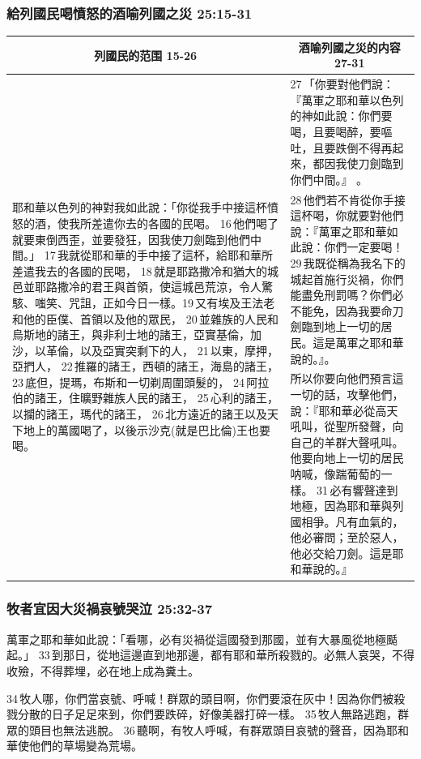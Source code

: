 \subsubsection{給列國民喝憤怒的酒喻列國之災 25:15-31}
\begin{table}[H]
\centering
\begin{tabular}{p{9.25cm}|p{}}\hline\hline
\multicolumn{1}{c|}{列國民的范围 15-26}&\multicolumn{1}{c}{酒喻列國之災的内容 27-31}\\\hline
\multirow{3}{9.35cm}{耶和華以色列的神對我如此說：「你從我手中接這杯憤怒的酒，使我所差遣你去的各國的民喝。 16 他們喝了就要東倒西歪，並要發狂，因我使刀劍臨到他們中間。」 17 我就從耶和華的手中接了這杯，給耶和華所差遣我去的各國的民喝， 18 就是耶路撒冷和猶大的城邑並耶路撒冷的君王與首領，使這城邑荒涼，令人驚駭、嗤笑、咒詛，正如今日一樣。19 又有埃及王法老和他的臣僕、首領以及他的眾民， 20 並雜族的人民和烏斯地的諸王，與非利士地的諸王，亞實基倫，加沙，以革倫，以及亞實突剩下的人， 21 以東，摩押，亞捫人， 22 推羅的諸王，西頓的諸王，海島的諸王， 23 底但，提瑪，布斯和一切剃周圍頭髮的， 24 阿拉伯的諸王，住曠野雜族人民的諸王， 25 心利的諸王，以攔的諸王，瑪代的諸王， 26 北方遠近的諸王以及天下地上的萬國喝了，以後示沙克(就是巴比倫)王也要喝。}
&27 「你要對他們說：『萬軍之耶和華以色列的神如此說：你們要喝，且要喝醉，要嘔吐，且要跌倒不得再起來，都因我使刀劍臨到你們中間。』 。\\\cline{2-2}
&28 他們若不肯從你手接這杯喝，你就要對他們說：『萬軍之耶和華如此說：你們一定要喝！ 29 我既從稱為我名下的城起首施行災禍，你們能盡免刑罰嗎？你們必不能免，因為我要命刀劍臨到地上一切的居民。這是萬軍之耶和華說的。』。\\\cline{2-2}
&所以你要向他們預言這一切的話，攻擊他們，說：『耶和華必從高天吼叫，從聖所發聲，向自己的羊群大聲吼叫。他要向地上一切的居民呐喊，像踹葡萄的一樣。 31 必有響聲達到地極，因為耶和華與列國相爭。凡有血氣的，他必審問；至於惡人，他必交給刀劍。這是耶和華說的。』\\\hline
\end{tabular}
\end{table}

\subsubsection{牧者宜因大災禍哀號哭泣 25:32-37}
萬軍之耶和華如此說：「看哪，必有災禍從這國發到那國，並有大暴風從地極颳起。」 33 到那日，從地這邊直到地那邊，都有耶和華所殺戮的。必無人哀哭，不得收殮，不得葬埋，必在地上成為糞土。 

34 牧人哪，你們當哀號、呼喊！群眾的頭目啊，你們要滾在灰中！因為你們被殺戮分散的日子足足來到，你們要跌碎，好像美器打碎一樣。 35 牧人無路逃跑，群眾的頭目也無法逃脫。 36 聽啊，有牧人呼喊，有群眾頭目哀號的聲音，因為耶和華使他們的草場變為荒場。 

